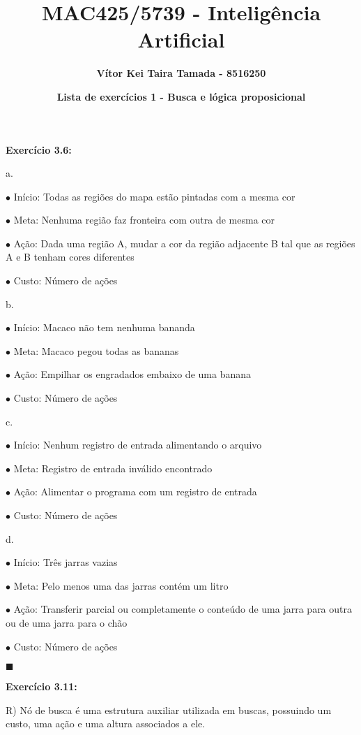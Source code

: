 \documentclass{article}
\title{\textbf{MAC425/5739 - Inteligência Artificial}}
\author{\textbf{Vítor Kei Taira Tamada - 8516250}}
\date{\textbf{Lista de exercícios 1 - Busca e lógica proposicional}}
\begin{document}
\maketitle

\textbf{Exercício 3.6:}

\quad a.

\qquad$\bullet$ Início: Todas as regiões do mapa estão pintadas com a mesma cor

\qquad$\bullet$ Meta: Nenhuma região faz fronteira com outra de mesma cor

\qquad$\bullet$ Ação: Dada uma região A, mudar a cor da região adjacente B tal que as regiões A e B tenham cores diferentes

\qquad$\bullet$ Custo: Número de ações

\bigskip
\quad b.

\qquad$\bullet$ Início: Macaco não tem nenhuma bananda

\qquad$\bullet$ Meta: Macaco pegou todas as bananas

\qquad$\bullet$ Ação: Empilhar os engradados embaixo de uma banana

\qquad$\bullet$ Custo: Número de ações

\bigskip
\quad c.

\qquad$\bullet$ Início: Nenhum registro de entrada alimentando o arquivo

\qquad$\bullet$ Meta: Registro de entrada inválido encontrado

\qquad$\bullet$ Ação: Alimentar o programa com um registro de entrada

\qquad$\bullet$ Custo: Número de ações

\bigskip
\quad d.

\qquad$\bullet$ Início: Três jarras vazias

\qquad$\bullet$ Meta: Pelo menos uma das jarras contém um litro

\qquad$\bullet$ Ação: Transferir parcial ou completamente o conteúdo de uma jarra para outra ou de uma jarra para o chão

\qquad$\bullet$ Custo: Número de ações

\begin{flushright}
$\blacksquare$
\end{flushright}


\bigskip
\textbf{Exercício 3.11:}

\quad R) Nó de busca é uma estrutura auxiliar utilizada em buscas, possuindo um custo, uma ação e uma altura associados a ele.
\end{document}
